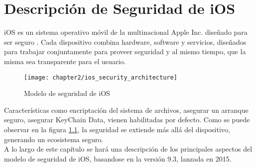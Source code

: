 \chapter{Descripción de Seguridad de iOS}
iOS es un sistema operativo móvil de la multinacional Apple Inc. diseñado para ser
seguro \cite{asg}. Cada dispositivo combina hardware, software y servicios, diseñados para trabajar
conjuntamente para proveer seguridad y al mismo tiempo, que la misma sea transparente para el
usuario.
\begin{figure}[htbp]
    \centering
    \texttt{[image: chapter2/ios\_security\_architecture]}
    \caption{Modelo de seguridad de iOS \cite{asg}} 
    \label{fig:ch02:security-architecture}
\end{figure}
Características como encriptación del sistema de archivos, asegurar un arranque seguro, asegurar
KeyChain Data, vienen habilitadas por defecto. Como se puede observar en la figura \ref{fig:ch02:security-architecture}, la seguridad se extiende más allá del dispositivo, generando un ecosistema seguro.\\
A lo largo de este capítulo se har\'a una descripci\'on de los principales aspectos del modelo de seguridad de iOS, basandose en la versión 9.3, lanzada en 2015.
